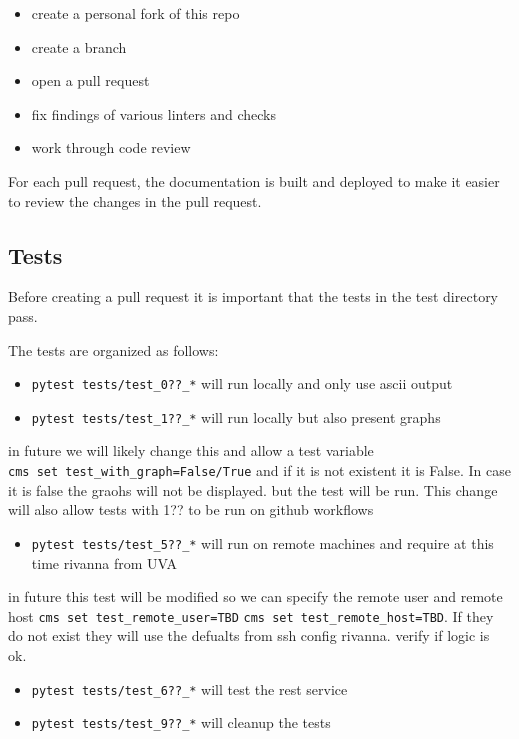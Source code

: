\begin{itemize}
\item
  create a personal fork of this repo
\item
  create a branch
\item
  open a pull request
\item
  fix findings of various linters and checks
\item
  work through code review
\end{itemize}

For each pull request, the documentation is built and deployed to make
it easier to review the changes in the pull request.

\hypertarget{tests}{%
\subsection{Tests}\label{tests}}

Before creating a pull request it is important that the tests in the
test directory pass.

The tests are organized as follows:

\begin{itemize}
\item
  \texttt{pytest\ tests/test\_0??\_*} will run locally and only use
  ascii output
\item
  \texttt{pytest\ tests/test\_1??\_*} will run locally but also present
  graphs
\end{itemize}

in future we will likely change this and allow a test variable
\texttt{cms\ set\ test\_with\_graph=False/True} and if it is not
existent it is False. In case it is false the graohs will not be
displayed. but the test will be run. This change will also allow tests
with 1?? to be run on github workflows

\begin{itemize}
\item
  \texttt{pytest\ tests/test\_5??\_*} will run on remote machines and
  require at this time rivanna from UVA
\end{itemize}

in future this test will be modified so we can specify the remote user
and remote host \texttt{cms\ set\ test\_remote\_user=TBD}
\texttt{cms\ set\ test\_remote\_host=TBD}. If they do not exist they
will use the defualts from ssh config rivanna. verify if logic is ok.

\begin{itemize}
\item
  \texttt{pytest\ tests/test\_6??\_*} will test the rest service
\item
  \texttt{pytest\ tests/test\_9??\_*} will cleanup the tests
\end{itemize}
